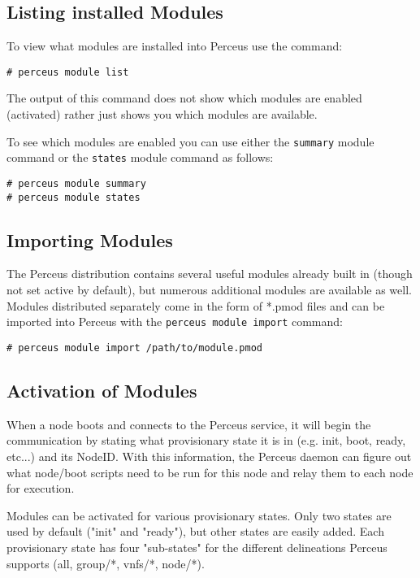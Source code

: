 \documentclass[10pt,letterpaper]{report}
\begin{document}
\subsection{Listing installed Modules}

To view what modules are installed into Perceus use the command:

\begin{verbatim}
# perceus module list
\end{verbatim}

The output of this command does not show which modules are enabled
(activated) rather just shows you which modules are available.

To see which modules are enabled you can use either the {\tt summary} module
command or the {\tt states} module command as follows:

\begin{verbatim}
# perceus module summary
# perceus module states
\end{verbatim}


\subsection{Importing Modules}

The Perceus distribution contains several useful modules already built in
(though not set active by default), but numerous additional modules are
available as well.  Modules distributed separately come in the form of *.pmod
files and can be imported into Perceus with the {\tt perceus module import}
command:

\begin{verbatim}
# perceus module import /path/to/module.pmod
\end{verbatim}

\subsection{Activation of Modules}

When a node boots and connects to the Perceus service, it will begin the
communication by stating what provisionary state it is in (e.g. init, boot,
ready, etc...) and its NodeID.  With this information, the Perceus daemon can
figure out what node/boot scripts need to be run for this node and relay them
to each node for execution.

Modules can be activated for various provisionary states.  Only two states are
used by default ("init" and "ready"), but other states are easily added.  Each
provisionary state has four "sub-states" for the different delineations
Perceus supports (all, group/*, vnfs/*, node/*).
\end{document}
